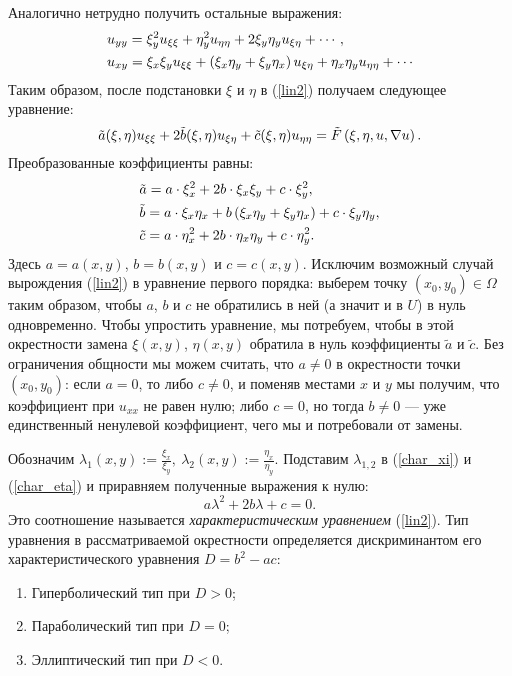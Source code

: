     Аналогично нетрудно получить остальные выражения:
    \begin{align*}
        & u_{yy} = \xi_y^2 u_{\xi\xi} + \eta_y^2 u_{\eta\eta} + 2 \xi_y\eta_y u_{\xi\eta} + \cdots,\\
        & u_{xy} = \xi_x\xi_y u_{\xi\xi} + \left({\xi_x\eta_y + \xi_y\eta_x}\right)u_{\xi\eta} + \eta_x\eta_yu_{\eta\eta} + \cdots
    \end{align*}
    Таким образом, после подстановки $\xi$ и $\eta$ в (\ref{lin2}) получаем следующее уравнение:
    \begin{equation*}
        \tilde{a}(\xi, \eta) u_{\xi\xi} + 2\tilde{b}(\xi, \eta)u_{\xi\eta} + \tilde{c}(\xi, \eta)u_{\eta\eta} = \tilde{F}\left({\xi, \eta, u, \nabla u}\right).
    \end{equation*}
    Преобразованные коэффициенты равны:
    \begin{align}
        & \tilde{a} = a\cdot\xi_x^2 + 2b\cdot\xi_x\xi_y + c\cdot\xi_y^2,\label{char_xi}\\
        & \tilde{b} = a\cdot\xi_x\eta_x + b\left({\xi_x\eta_y +\xi_y\eta_x}\right) + c\cdot\xi_y\eta_y, \notag \\
        & \tilde{c} = a\cdot\eta_x^2 + 2b\cdot\eta_x\eta_y + c\cdot\eta_y^2. \label{char_eta}
    \end{align}
    Здесь $a = a(x, y)$, $b = b(x, y)$ и $c = c(x, y)$. Исключим возможный случай вырождения (\ref{lin2}) в уравнение первого порядка: выберем точку
    $(x_0, y_0) \in \Omega$ таким образом, чтобы $a$, $b$ и $c$ не обратились в ней
    (а значит и в $U$) в нуль одновременно. Чтобы упростить уравнение, мы потребуем, чтобы в этой окрестности замена $\xi(x, y)$, $\eta(x,y)$ обратила
    в нуль коэффициенты $\tilde{a}$ и $\tilde{c}$. Без ограничения общности мы можем считать, что $a \not= 0$ в окрестности точки $(x_0, y_0)$:
    если $a = 0$, то либо $c \not= 0$, и поменяв местами $x$ и $y$ мы получим, что коэффициент при $u_{xx}$ не равен нулю; либо $c = 0$, но тогда
    $b \not= 0$ --- уже единственный ненулевой коэффициент, чего мы и потребовали от замены.
    
    Обозначим $\lambda_1(x,y) := \frac{\xi_x}{\xi_y},\: \lambda_2(x, y) := \frac{\eta_x}{\eta_y}$. Подставим $\lambda_{1,2}$ в (\ref{char_xi})
    и (\ref{char_eta}) и приравняем полученные выражения к нулю:
    \begin{equation*}
        a \lambda^2 + 2b\lambda + c = 0.
    \end{equation*}
    Это соотношение называется \textit{характеристическим уравнением} (\ref{lin2}). Тип уравнения в рассматриваемой окрестности определяется дискриминантом
    его характеристического уравнения $D = b^2 - ac$:
    \begin{enumerate}
        \item Гиперболический тип при $D > 0$;
        \item Параболический тип при $D = 0$;
        \item Эллиптический тип при $D < 0$.
    \end{enumerate}

